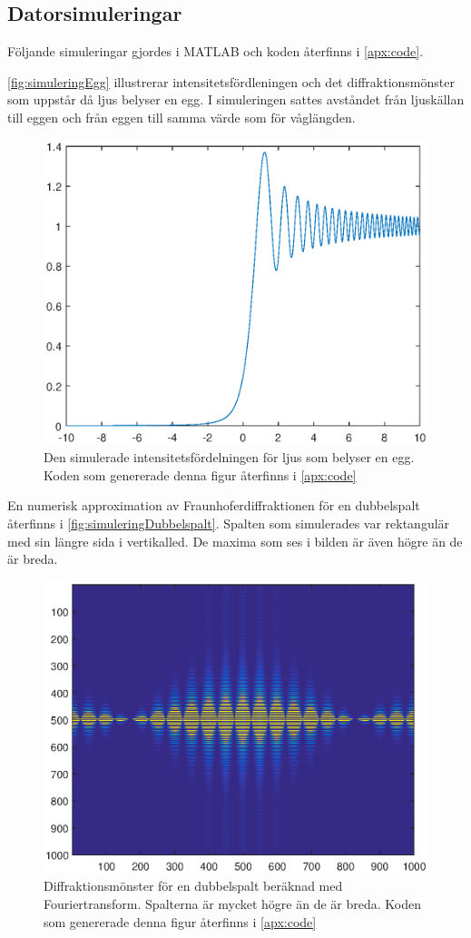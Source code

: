 \documentclass[a4paper]{article}
\begin{document}
\FloatBarrier

\subsection{Datorsimuleringar}

Följande simuleringar gjordes i \textsc{MATLAB} och koden återfinns i \autoref{apx:code}.

\autoref{fig:simuleringEgg} illustrerar intensitetsfördleningen och det diffraktionsmönster som uppstår då ljus belyser en egg. I simuleringen sattes avståndet från ljuskällan till eggen och från eggen till samma värde som för våglängden.

\FloatBarrier

\begin{figure}[h!]
	\centering
	\includegraphics[width=0.5\linewidth]{Data/Figurer/simuleringEgg.eps}
	\caption{Den simulerade intensitetsfördelningen för ljus som belyser en egg. Koden som genererade denna figur återfinns i \autoref{apx:code}}
	\label{fig:simuleringEgg}
\end{figure}

\FloatBarrier

En numerisk approximation av Fraunhoferdiffraktionen för en dubbelspalt återfinns i \autoref{fig:simuleringDubbelspalt}. Spalten som simulerades var rektangulär med sin längre sida i vertikalled. De maxima som ses i bilden är även högre än de är breda.

\FloatBarrier

\begin{figure}[h!]
	\centering
	\includegraphics[width=0.5\linewidth]{Data/Figurer/simuleringDubbelspalt.eps}
	\caption{Diffraktionsmönster för en dubbelspalt beräknad med Fouriertransform. Spalterna är mycket högre än de är breda. Koden som genererade denna figur återfinns i \autoref{apx:code}}
	\label{fig:simuleringDubbelspalt}
\end{figure}
\end{document}
